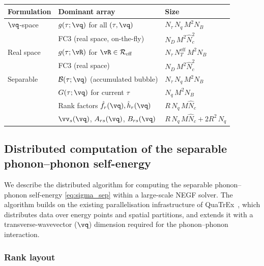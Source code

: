 \begin{center}
\begin{tabular}{lll}
  \toprule
  Formulation & Dominant array & Size \\
  \midrule
  $\vq$-space
    & $g(\tau;\vq)$ for all $(\tau,\vq)$
    & $N_\tau\,N_q\,M^2 N_B$ \\
    & FC3 (real space, on-the-fly)
    & $N_D\,M^2\hat{N}_c^2$ \\[4pt]
  Real space
    & $g(\tau;\vR)$ for $\vR\in\mathcal{R}_\mathrm{eff}$
    & $N_\tau\,N_T^\mathrm{eff}\,M^2 N_B$ \\
    & FC3 (real space)
    & $N_D\,M^2\hat{N}_c^2$ \\[4pt]
  Separable
    & $\mathcal{B}(\tau;\vq)$ (accumulated bubble)
    & $N_\tau\,N_q\,M^2 N_B$ \\
    & $G(\tau;\vq)$ for current $\tau$
    & $N_q\,M^2 N_B$ \\
    & Rank factors $\hat{f}_r(\vq), \hat{h}_r(\vq)$
    & $R\,N_q\,M\hat{N}_c$ \\
    & $\vv_s(\vq)$, $A_{rs}(\vq)$, $B_{rs}(\vq)$
    & $R\,N_q\,M\hat{N}_c + 2R^2\,N_q$ \\
  \bottomrule
\end{tabular}
\end{center}

\subsection{Distributed computation of the separable
  phonon--phonon self-energy}
\label{sub:distributed}

We describe the distributed algorithm for computing the
separable phonon--phonon self-energy
\cref{eq:sigma_sep} within a large-scale NEGF solver.
The algorithm builds on the existing parallelisation
infrastructure of QuaTrEx~\cite{vetsch_ab-initio_2025}, which
distributes data over energy points and spatial partitions,
and extends it with a transverse-wavevector ($\vq$) dimension
required for the phonon--phonon interaction.

\subsubsection{Rank layout}
\label{sssub:rank_layout}


